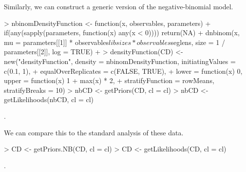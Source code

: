 \documentclass[a4paper]{article}
\begin{document}
Similarly, we can construct a generic version of the negative-binomial model.
\begin{Schunk}
\begin{Sinput}
> nbinomDensityFunction <- function(x, observables, parameters) {
+   if(any(sapply(parameters, function(x) any(x < 0)))) return(NA)
+   dnbinom(x, mu = parameters[[1]] * observables$libsizes * observables$seglens, size = 1 / parameters[[2]], log = TRUE)
+ }
> densityFunction(CD) <- new("densityFunction", density = nbinomDensityFunction, initiatingValues = c(0.1, 1),
+                           equalOverReplicates = c(FALSE, TRUE),
+                           lower = function(x) 0, upper = function(x) 1 + max(x) * 2,
+                           stratifyFunction = rowMeans, stratifyBreaks = 10)
> nbCD <- getPriors(CD, cl = cl)
> nbCD <- getLikelihoods(nbCD, cl = cl)
\end{Sinput}
\begin{Soutput}
.
\end{Soutput}
\end{Schunk}

We can compare this to the standard analysis of these data. 
\begin{Schunk}
\begin{Sinput}
> CD <- getPriors.NB(CD, cl = cl)
> CD <- getLikelihoods(CD, cl = cl)
\end{Sinput}
\begin{Soutput}
.
\end{Soutput}
\end{Schunk}
\end{document}
